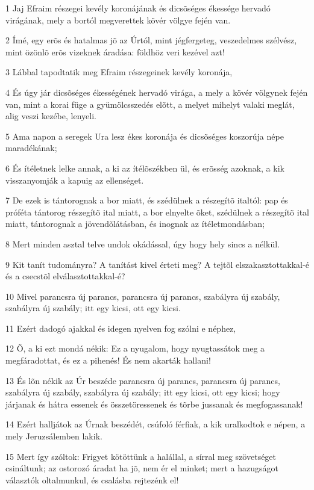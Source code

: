 \par 1 Jaj Efraim részegei kevély koronájának és dicsõséges ékessége hervadó virágának, mely a bortól megverettek kövér völgye fején van.
\par 2 Ímé, egy erõs és hatalmas jõ az Úrtól, mint jégfergeteg, veszedelmes szélvész, mint özönlõ erõs vizeknek áradása: földhöz veri kezével azt!
\par 3 Lábbal tapodtatik meg Efraim részegeinek kevély koronája,
\par 4 És úgy jár dicsõséges ékességének hervadó virága, a mely a kövér völgynek fején van, mint a korai füge a gyümölcsszedés elõtt, a melyet mihelyt valaki meglát, alig veszi kezébe, lenyeli.
\par 5 Ama napon a seregek Ura lesz ékes koronája és dicsõséges koszorúja népe maradékának;
\par 6 És ítéletnek lelke annak, a ki az ítélõszékben ül, és erõsség azoknak, a kik visszanyomják a kapuig az ellenséget.
\par 7 De ezek is tántorognak a bor miatt, és szédülnek a részegítõ italtól: pap és próféta tántorog részegítõ ital miatt, a bor elnyelte õket, szédülnek a részegítõ ital miatt, tántorognak a jövendõlátásban, és inognak az ítéletmondásban;
\par 8 Mert minden asztal telve undok okádással, úgy hogy hely sincs a nélkül.
\par 9 Kit tanít tudományra? A tanítást kivel érteti meg? A tejtõl elszakasztottakkal-é és a csecstõl elválasztottakkal-é?
\par 10 Mivel parancsra új parancs, parancsra új parancs, szabályra új szabály, szabályra új szabály; itt egy kicsi, ott egy kicsi.
\par 11 Ezért dadogó ajakkal és idegen nyelven fog szólni e néphez,
\par 12 Õ, a ki ezt mondá nékik: Ez a nyugalom, hogy nyugtassátok meg a megfáradottat, és ez a pihenés! És nem akarták hallani!
\par 13 És lõn nékik az Úr beszéde parancsra új parancs, parancsra új parancs, szabályra új szabály, szabályra új szabály; itt egy kicsi, ott egy kicsi; hogy járjanak és hátra essenek és összetöressenek és tõrbe jussanak és megfogassanak!
\par 14 Ezért halljátok az Úrnak beszédét, csúfoló férfiak, a kik uralkodtok e népen, a mely Jeruzsálemben lakik.
\par 15 Mert így szóltok: Frigyet kötöttünk a halállal, a sírral meg szövetséget csináltunk; az ostorozó áradat ha jõ, nem ér el minket; mert a hazugságot választók oltalmunkul, és csalásba rejtezénk el!
